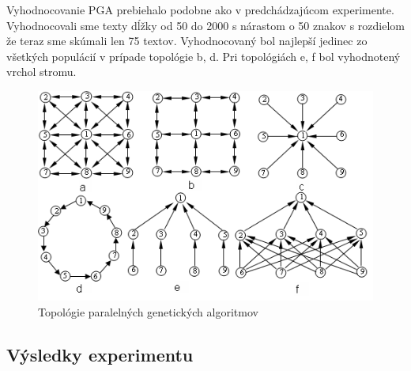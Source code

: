 Vyhodnocovanie PGA prebiehalo podobne ako v predchádzajúcom experimente. Vyhodnocovali sme texty dĺžky od 50 do 2000 s nárastom o 50 znakov s rozdielom že teraz sme skúmali len 75 textov. Vyhodnocovaný bol najlepší jedinec zo všetkých populácií v prípade topológie b, d. Pri topológiách e, f bol vyhodnotený vrchol stromu. 
\begin{figure}[!htbp]
  \centering
  \includegraphics[width=\textwidth]{img/topology.png}
  \caption{Topológie paralelných genetických algoritmov}
  \label{img:topology}
\end{figure}

\clearpage
\subsection{Výsledky experimentu}










